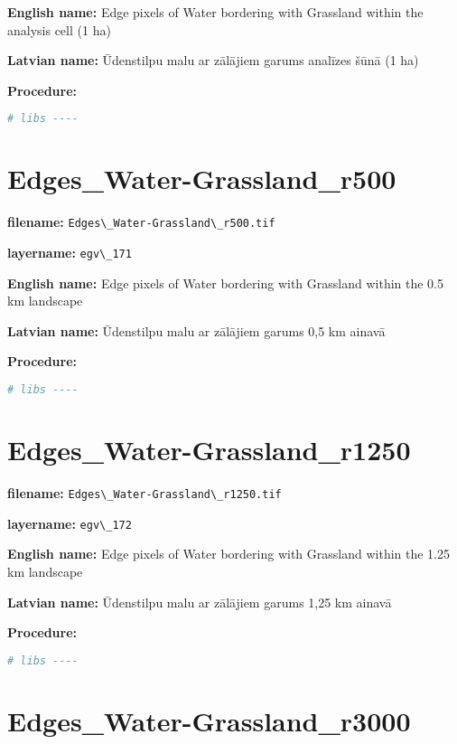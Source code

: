 \documentclass[
]{book}
\newcommand{\passthrough}[1]{#1}
\begin{document}
\textbf{English name:} Edge pixels of Water bordering with Grassland within the analysis cell (1 ha)

\textbf{Latvian name:} Ūdenstilpu malu ar zālājiem garums analīzes šūnā (1 ha)

\textbf{Procedure:}

\begin{lstlisting}[language=R]
# libs ----
\end{lstlisting}

\section{Edges\_Water-Grassland\_r500}\label{ch06.171}

\textbf{filename:} \passthrough{\lstinline!Edges\_Water-Grassland\_r500.tif!}

\textbf{layername:} \passthrough{\lstinline!egv\_171!}

\textbf{English name:} Edge pixels of Water bordering with Grassland within the 0.5 km landscape

\textbf{Latvian name:} Ūdenstilpu malu ar zālājiem garums 0,5 km ainavā

\textbf{Procedure:}

\begin{lstlisting}[language=R]
# libs ----
\end{lstlisting}

\section{Edges\_Water-Grassland\_r1250}\label{ch06.172}

\textbf{filename:} \passthrough{\lstinline!Edges\_Water-Grassland\_r1250.tif!}

\textbf{layername:} \passthrough{\lstinline!egv\_172!}

\textbf{English name:} Edge pixels of Water bordering with Grassland within the 1.25 km landscape

\textbf{Latvian name:} Ūdenstilpu malu ar zālājiem garums 1,25 km ainavā

\textbf{Procedure:}

\begin{lstlisting}[language=R]
# libs ----
\end{lstlisting}

\section{Edges\_Water-Grassland\_r3000}\label{ch06.173}
\end{document}

